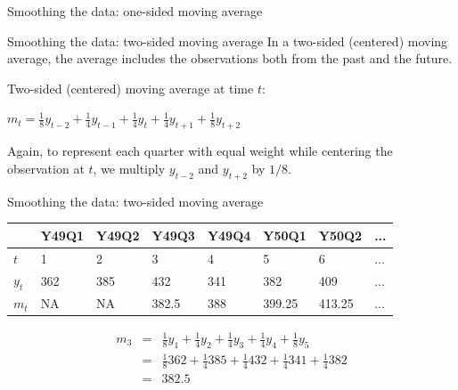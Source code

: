 \documentclass{beamer}\usepackage[]{graphicx}\usepackage[]{color}
\newenvironment{knitrout}{}{} %
\begin{document}
\begin{darkframes}
\begin{frame}[fragile]{Smoothing the data: one-sided moving average}
\begin{knitrout}
\end{knitrout}
    
    \end{frame}
    
    
    
    
    
    
    
    
        \begin{frame}[fragile]{Smoothing the data: two-sided moving average}
    \fontsize{9}{9}\selectfont
        In a \alert{two-sided (centered) moving average}, the average includes the observations both from the past and the future.
        \bigskip
        
        Two-sided (centered) moving average at time $t$:
        
        \begin{center}
          $m_t = \frac{1}{8} y_{t-2} + \frac{1}{4} y_{t-1} + \frac{1}{4} y_{t} + \frac{1}{4} y_{t+1}  + \frac{1}{8} y_{t+2}$
        \end{center}  
        
        Again, to represent each quarter with equal weight while centering the observation at $t$, we multiply $y_{t-2}$ and $y_{t+2}$ by $1/8$. 
        
    \end{frame}
    
    
    
    \begin{frame}[fragile]{Smoothing the data: two-sided moving average}
      \fontsize{9}{9}\selectfont
      \begin{center}
          \begin{tabular}{llllllll}
          \hline
            & Y49Q1 & Y49Q2 & Y49Q3 & Y49Q4 & Y50Q1 & Y50Q2 & ... \\
          \hline
           $t$ & 1  &	2 &	3 &	4 &	5 &	6 & ... \\
          $y_t$ & 362 &	385 &	432 &	341 &	382 &	409 & ... \\
          $m_t$ & NA &	NA &	382.5	& 388 &	399.25 & 	413.25 & ... \\
            \hline 
        \end{tabular}
      \end{center}
      
      \begin{center}
        \begin{eqnarray*}
          m_3 &=& \frac{1}{8} y_{1} + \frac{1}{4} y_{2} + \frac{1}{4} y_{3} + \frac{1}{4} y_{4} + \frac{1}{8} y_{5} \\
          &=& \frac{1}{8} 362 + \frac{1}{4} 385 + \frac{1}{4} 432 + \frac{1}{4} 341 + \frac{1}{4} 382 \\
          &=& 382.5
        \end{eqnarray*} 
      \end{center} 
      

\end{frame}
\end{darkframes}
\end{document}
